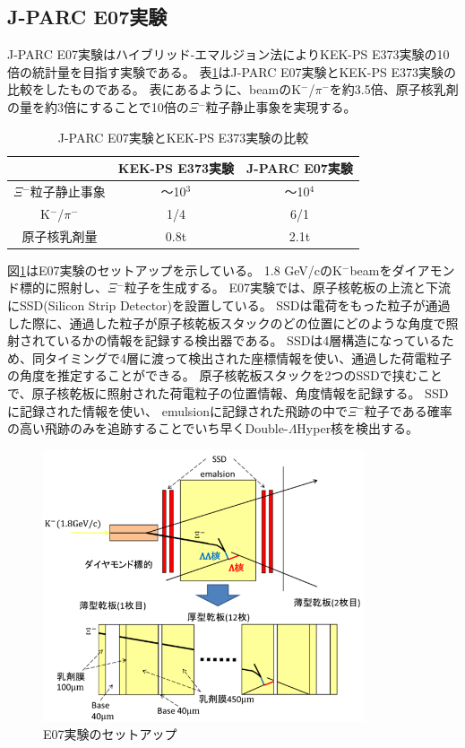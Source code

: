 \documentclass[12pt,a4paper]{jarticle}
\begin{document}
\subsection{J-PARC E07実験}
J-PARC E07実験はハイブリッド-エマルジョン法によりKEK-PS E373実験の10倍の統計量を目指す実験である。
表\ref{tab:compare_E07_E373}はJ-PARC E07実験とKEK-PS E373実験の比較をしたものである。
表にあるように、beamのK$^-$/$\pi$$^-$を約3.5倍、原子核乳剤の量を約3倍にすることで10倍の$\Xi$$^-$粒子静止事象を実現する。
\begin{table}[htbp]
  \centering
  \caption{J-PARC E07実験とKEK-PS E373実験の比較\label{tab:compare_E07_E373}}
  \begin{tabular}{c|c|c}
  　　　&KEK-PS E373実験&J-PARC E07実験\\
  \hline
  \hline
  $\Xi$$^-$粒子静止事象 & ～10$^3$    & ～10$^4$  \\
  K$^-$/$\pi$$^-$ & 1/4  & 6/1 \\
  原子核乳剤量 & 0.8t & 2.1t  \\
  \hline
  \end{tabular}
\end{table}
\par
図\ref{fig:e07setup}はE07実験のセットアップを示している。
1.8 GeV/cのK$^-$beamをダイアモンド標的に照射し、$\Xi$$^-$粒子を生成する。
E07実験では、原子核乾板の上流と下流にSSD(Silicon Strip Detector)を設置している。
SSDは電荷をもった粒子が通過した際に、通過した粒子が原子核乾板スタックのどの位置にどのような角度で照射されているかの情報を記録する検出器である。
SSDは4層構造になっているため、同タイミングで4層に渡って検出された座標情報を使い、通過した荷電粒子の角度を推定することができる。
原子核乾板スタックを2つのSSDで挟むことで、原子核乾板に照射された荷電粒子の位置情報、角度情報を記録する。
SSDに記録された情報を使い、
emulsionに記録された飛跡の中で$\Xi$$^-$粒子である確率の高い飛跡のみを追跡することでいち早くDouble-$\Lambda$Hyper核を検出する。
\begin{figure}[htbp]
  \centering
     \includegraphics[width=95mm]{e07setup.png}
  \caption{E07実験のセットアップ\label{fig:e07setup}}
\end{figure}
\end{document}
